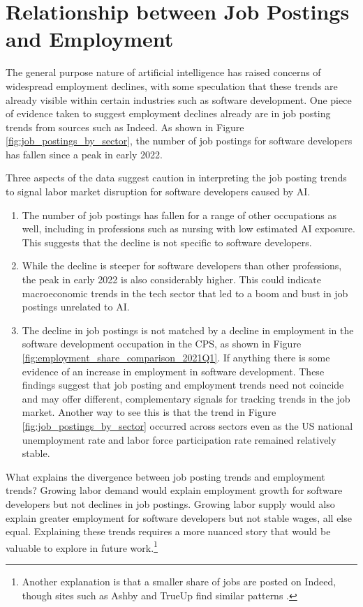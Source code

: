 \documentclass[12pt]{article}
\numberwithin{equation}{section}
\theoremstyle{theorem}\newcustomtheorem{theorem}{{\bf\sc Theorem}}
\theoremstyle{definition}\newcustomtheorem{assumption}{{\bf\sc Assumption}}
\theoremstyle{theorem} \newcustomtheorem{proposition}{{\bf\sc Proposition}}
\begin{document}
\section{Relationship between Job Postings and Employment}

The general purpose nature of artificial intelligence has raised concerns of widespread employment declines, with some speculation that these trends are already visible within certain industries such as software development. One piece of evidence taken to suggest employment declines already are in job posting trends from sources such as Indeed. As shown in Figure \ref{fig:job_postings_by_sector}, the number of job postings for software developers has fallen since a peak in early 2022. 

Three aspects of the data suggest caution in interpreting the job posting trends to signal labor market disruption for software developers caused by AI. 
\begin{enumerate}
	\item The number of job postings has fallen for a range of other occupations as well, including in professions such as nursing with low estimated AI exposure. This suggests that the decline is not specific to software developers. 
	\item While the decline is steeper for software developers than other professions, the peak in early 2022 is also considerably higher. This could indicate macroeconomic trends in the tech sector that led to a boom and bust in job postings unrelated to AI. 
	\item The decline in job postings is not matched by a decline in employment in the software development occupation in the CPS, as shown in Figure \ref{fig:employment_share_comparison_2021Q1}. If anything there is some evidence of an increase in employment in software development. These findings suggest that job posting and employment trends need not coincide and may offer different, complementary signals for tracking trends in the job market. Another way to see this is that the trend in Figure \ref{fig:job_postings_by_sector} occurred across sectors even as the US national unemployment rate and labor force participation rate remained relatively stable. 
\end{enumerate}



What explains the divergence between job posting trends and employment trends? Growing labor demand would explain employment growth for software developers but not declines in job postings. Growing labor supply would also explain greater employment for software developers but not stable wages, all else equal. Explaining these trends requires a more nuanced story that would be valuable to explore in future work.\footnote{Another explanation is that a smaller share of jobs are posted on Indeed, though sites such as Ashby and TrueUp find similar patterns \citep{Codell2023_TrendsReport, Rachitsky2025_ProductMarket}.} 
\end{document}
